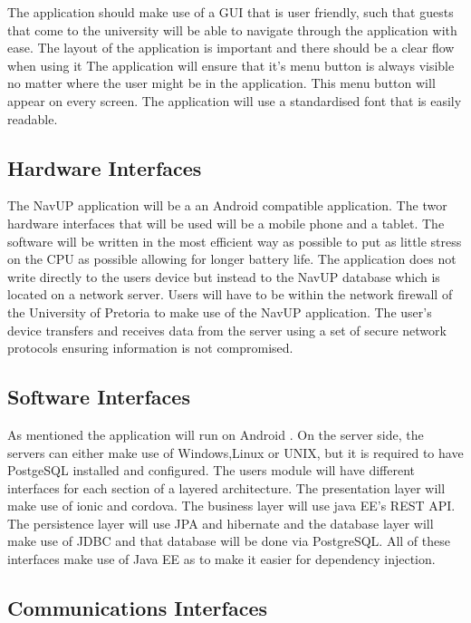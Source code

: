 \documentclass{article}
\begin{document}
The application should make use of a GUI that is user friendly, such that guests that come to the university will be able to navigate through the application with ease. The layout of the application is important and there should be a clear flow when using it The application will ensure that it's menu button is always visible no matter where the user might be in the application. This menu button will appear on every screen. The application will use a standardised font that is easily readable.
	
	\subsection{Hardware Interfaces}
	
	The NavUP application will be a an Android compatible application. The twor hardware interfaces that will be used will be a mobile phone and a tablet. The software will be written in the most efficient way as possible to put as little stress on the CPU as possible
allowing for longer battery life. The application does not write directly to the users device but instead to the NavUP database which is located on a 
network server. Users will have to be within the network firewall of the University of Pretoria to make use of the NavUP application. The user's device
transfers and receives data from the server using a set of secure network protocols ensuring information is not compromised.

	\subsection{Software Interfaces}	

As mentioned the application will run on Android . On the server side, the servers can either make use of Windows,Linux or UNIX, but it is required
to have PostgeSQL installed and configured.
The users module will have different interfaces for each section of a layered architecture. The presentation layer will make use of ionic and cordova. The business layer will use java EE's REST API.  The persistence layer will use JPA and hibernate and the database layer will make use of JDBC and that database will be done via PostgreSQL. All of these interfaces make use of Java EE as to make it easier for dependency injection.

\subsection{Communications Interfaces}
	
\end{document}
